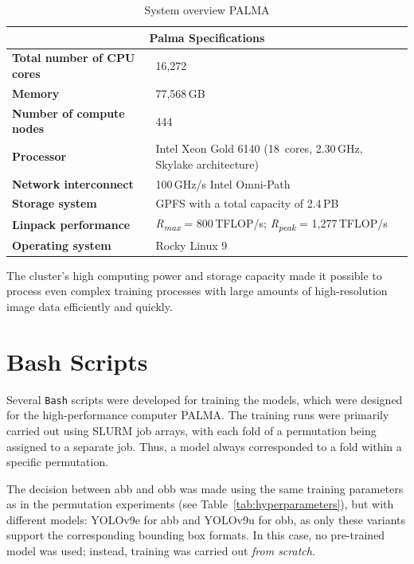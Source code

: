 \begin{table}[h!]
\centering
\begin{tabular}{ll}
\multicolumn{2}{c}{\textbf{Palma Specifications}} \\ \hline
\textbf{Total number of \acrshort{CPU} cores} & 16,272 \\
\textbf{Memory} & 77,568\,\acrshort{GB} \\
\textbf{Number of compute nodes} & 444 \\
\textbf{Processor} & Intel Xeon Gold 6140 (18~cores, 2.30\,\acrshort{GHz}, Skylake architecture) \\
\textbf{Network interconnect} & 100\,\acrshort{GHz}/s Intel Omni-Path \\
\textbf{Storage system} & \acrshort{GPFS} with a total capacity of 2.4\,\acrshort{PB} \\
\textbf{Linpack performance} & \textit{R\textsubscript{max}} = 800\,\acrshort{TFLOP}/s; \textit{R\textsubscript{peak}} = 1,277\,\acrshort{TFLOP}/s \\
\textbf{Operating system} & Rocky Linux 9 \\
\hline
\end{tabular}
\caption{System overview PALMA}
\label{tab:Spec_Palma}
\end{table}

The cluster's high computing power and storage capacity made it possible to process even complex training processes with large amounts of high-resolution image data efficiently and quickly.



\section{Bash Scripts}

Several \texttt{Bash} scripts were developed for training the models, which were designed for the high-performance computer \acrshort{PALMA}. The training runs were primarily carried out using \acrshort{SLURM} job arrays, with each fold of a permutation being assigned to a separate job. Thus, a model always corresponded to a fold within a specific permutation.  

The decision between \acrlong{abb} and \acrlong{obb} was made using the same training parameters as in the permutation experiments (see Table~\ref{tab:hyperparameters}), but with different models: \acrshort{YOLO}v9e for \acrshort{abb} and \acrshort{YOLO}v9u for \acrshort{obb}, as only these variants support the corresponding bounding box formats. In this case, no pre-trained model was used; instead, training was carried out \textit{from scratch}.
  
